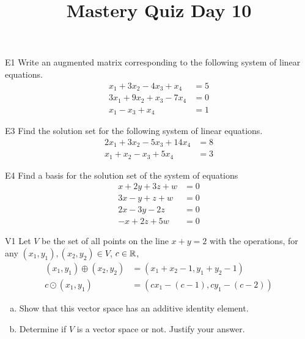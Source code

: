 \documentclass{sbgLAquiz}
\title{Mastery Quiz Day 10 }
\begin{document}
\begin{problem}{E1}
Write an augmented matrix corresponding to the following system of linear equations.
\begin{align*}
x_1+3x_2-4x_3 +x_4 &= 5 \\
3x_1+9x_2+x_3-7x_4 &= 0 \\
x_1-x_3 +x_4 &= 1
\end{align*}
\end{problem}

\begin{problem}{E3}
Find the solution set for the following system of linear equations.
\begin{align*}
2x_1+3x_2-5x_3+14x_4 &= 8 \\
x_1+x_2-x_3+5x_4&= 3
\end{align*}
\end{problem}
\newpage

\begin{problem}{E4}
Find a basis for the solution set of the system of equations
\begin{align*}
x+2y+3z+w &= 0 \\
3x-y+z+w &= 0 \\
2x-3y-2z &= 0 \\
-x+2z+5w &=0
\end{align*}
\end{problem}

\begin{problem}{V1}
Let $V$ be the set of all points on the line $x+y=2$ with the operations, for any $(x_1,y_1), (x_2,y_2) \in V$, $c \in \mathbb{R}$,
\begin{align*}
(x_1,y_1) \oplus (x_2,y_2) &= (x_1+x_2-1,y_1+y_2-1) \\
c \odot (x_1,y_1) &= (cx_1-(c-1), cy_1-(c-2))
\end{align*}
\begin{enumerate}[(a)]
\item Show that this vector space has an additive identity element.
\item Determine if $V$ is a vector space or not.  Justify your answer.
\end{enumerate}
\end{problem}
\end{document}

